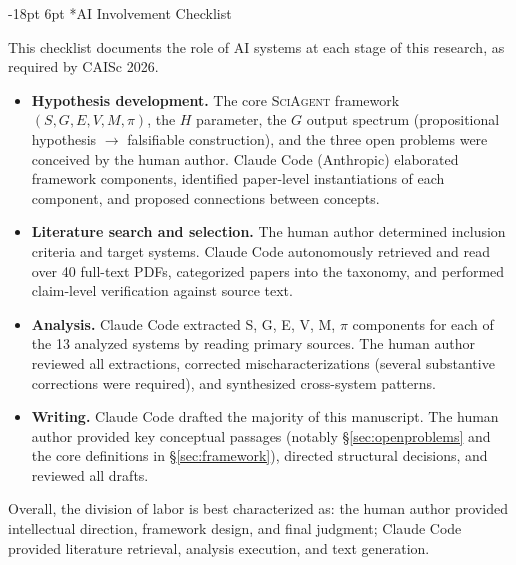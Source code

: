\documentclass[11pt]{article}
\makeatletter
\renewcommand\section{\@startsection{section}{1}{\z@}%
  {-18pt \@plus -4pt \@minus -2pt}%
  {6pt \@plus 2pt}%
  {\normalfont\large\bfseries}}
\newcommand{\sgmvpi}{$(S, G, E, V, M, \pi)$}
\newcommand{\framework}{\textsc{SciAgent}}
\makeatother
\begin{document}



\newpage
\section*{AI Involvement Checklist}
\label{sec:ai-checklist}

This checklist documents the role of AI systems at each stage of this research, as required by CAISc 2026.

\begin{itemize}
  \item \textbf{Hypothesis development.} The core \framework{} framework \sgmvpi{}, the $H$ parameter, the $G$ output spectrum (propositional hypothesis $\to$ falsifiable construction), and the three open problems were conceived by the human author. Claude Code (Anthropic) elaborated framework components, identified paper-level instantiations of each component, and proposed connections between concepts.

  \item \textbf{Literature search and selection.} The human author determined inclusion criteria and target systems. Claude Code autonomously retrieved and read over 40 full-text PDFs, categorized papers into the taxonomy, and performed claim-level verification against source text.

  \item \textbf{Analysis.} Claude Code extracted S, G, E, V, M, $\pi$ components for each of the 13 analyzed systems by reading primary sources. The human author reviewed all extractions, corrected mischaracterizations (several substantive corrections were required), and synthesized cross-system patterns.

  \item \textbf{Writing.} Claude Code drafted the majority of this manuscript. The human author provided key conceptual passages (notably \S\ref{sec:openproblems} and the core definitions in \S\ref{sec:framework}), directed structural decisions, and reviewed all drafts.
\end{itemize}

\noindent Overall, the division of labor is best characterized as: the human author provided intellectual direction, framework design, and final judgment; Claude Code provided literature retrieval, analysis execution, and text generation.

\newpage
\end{document}

